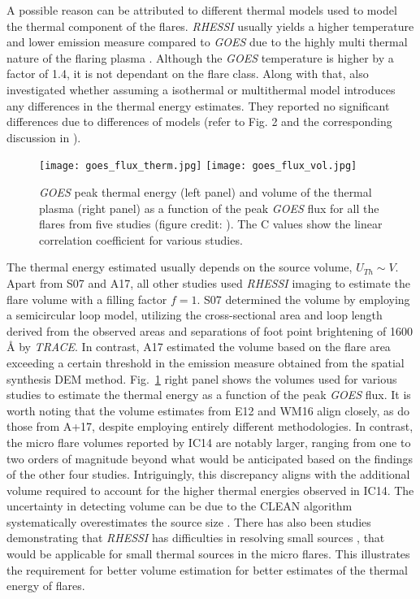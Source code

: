 A possible reason can be attributed to different thermal models used to model the thermal component of the flares. {\it RHESSI} usually yields a higher temperature and lower emission measure compared to {\it GOES} due to the highly multi thermal nature of the flaring plasma \citep{bataglia05,ryan14,warmuth16a}. Although the {\it GOES} temperature is higher by a factor of 1.4, it is not dependant on the flare class. Along with that, \cite{warmuth20} also investigated whether assuming a isothermal or multithermal model introduces any differences in the thermal energy estimates. They reported no significant differences due to differences of models (refer to Fig. 2 and the corresponding discussion in \cite{warmuth20}).

\begin{figure}[ht!]
    \centering
    \texttt{[image: goes\_flux\_therm.jpg]}
    \texttt{[image: goes\_flux\_vol.jpg]}
    \caption{{\it GOES} peak thermal energy (left panel) and volume of the thermal plasma (right panel) as a function of the peak {\it GOES} flux for all the flares from five studies (figure credit: \cite{warmuth20}). The C values show the linear correlation coefficient for various studies.}
    \label{fig:goes-therm}
\end{figure}

The thermal energy estimated usually depends on the source volume, $U_{Th}\sim V$. Apart from S07 and A17, all other studies used {\it RHESSI} imaging to estimate the flare volume with a filling factor $f=1$. S07 determined the volume by employing a semicircular loop model, utilizing the cross-sectional area and loop length derived from the observed areas and separations of foot point brightening of 1600 {\AA} by {\it TRACE}. In contrast, A17 estimated the volume based on the flare area exceeding a certain threshold in the emission measure obtained from the spatial synthesis DEM method. Fig.~\ref{fig:goes-therm} right panel shows the volumes used for various studies to estimate the thermal energy as a function of the peak {\it GOES} flux. It is worth noting that the volume estimates from E12 and WM16 align closely, as do those from A+17, despite employing entirely different methodologies. In contrast, the micro flare volumes reported by IC14 are notably larger, ranging from one to two orders of magnitude beyond what would be anticipated based on the findings of the other four studies. Intriguingly, this discrepancy aligns with the additional volume required to account for the higher thermal energies observed in IC14. The uncertainty in detecting volume can be due to the CLEAN algorithm systematically overestimates the source size \citep{warmuth13a}. There has also been studies demonstrating that {\it RHESSI} has difficulties in resolving small sources \citep{dennis09,warmuth13b}, that would be applicable for small thermal sources in the micro flares. This illustrates the requirement for better volume estimation for better estimates of the thermal energy of flares.

